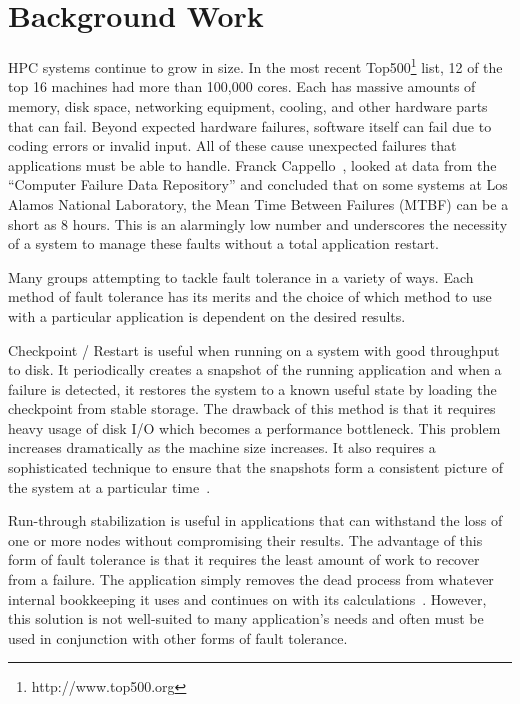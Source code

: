 \documentclass[]{article}
\begin{document}
\section{Background Work}
\label{sect:background}

HPC systems continue to grow in size. In the most recent Top500\footnote{http://www.top500.org} list, 12 of the top 16 machines had more than 100,000 cores. Each has massive amounts of memory, disk space, networking equipment, cooling, and other hardware parts that can fail. Beyond expected hardware failures, software itself can fail due to coding errors or invalid input. All of these cause unexpected failures that applications must be able to handle. Franck Cappello~\cite{Cappello:2009dd}, looked at data from the ``Computer Failure Data Repository'' and concluded that on some systems at Los Alamos National Laboratory, the Mean Time Between Failures (MTBF) can be a short as 8 hours. This is an alarmingly low number and underscores the necessity of a system to manage these faults without a total application restart.


Many groups attempting to tackle fault tolerance in a variety of ways. Each method of fault tolerance has its merits and the choice of which method to use with a particular application is dependent on the desired results.

Checkpoint / Restart is useful when running on a system with good throughput to disk. It periodically creates a snapshot of the running application and when a failure is detected, it restores the system to a known useful state by loading the checkpoint from stable storage. The drawback of this method is that it requires heavy usage of disk I/O which becomes a performance bottleneck. This problem increases dramatically as the machine size increases. It also requires a sophisticated technique to ensure that the snapshots form a consistent picture of the system at a particular time~\cite{Chandy:1985ip}.

Run-through stabilization is useful in applications that can withstand the loss of one or more nodes without compromising their results. The advantage of this form of fault tolerance is that it requires the least amount of work to recover from a failure. The application simply removes the dead process from whatever internal bookkeeping it uses and continues on with its calculations~\cite{Cappello:2009dd}. However, this solution is not well-suited to many application's needs and often must be used in conjunction with other forms of fault tolerance.
\end{document}

